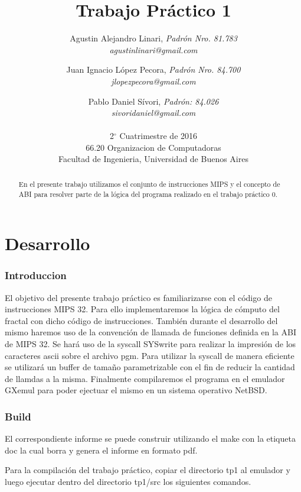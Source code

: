 \documentclass{article}
\title{Trabajo Práctico 1}
\author{
  Agustin Alejandro Linari, \textit{Padrón Nro. 81.783}\\
  \textit{agustinlinari@gmail.com}\\
  \and
  Juan Ignacio López Pecora, \textit{Padrón Nro. 84.700}\\
  \textit{jlopezpecora@gmail.com}\\
  \and
  Pablo Daniel Sívori, \textit{Padrón: 84.026}\\
  \textit{sivoridaniel@gmail.com}\\
  \\
  \normalsize{2$^{\circ}$ Cuatrimestre de 2016}                           \\
  \normalsize{66.20 Organizacion de Computadoras}                  \\
  \normalsize{Facultad de Ingenieria, Universidad de Buenos Aires} \\
}
\begin{document}

\maketitle


\begin{abstract}
En el presente trabajo utilizamos el conjunto de instrucciones MIPS y el concepto de ABI para resolver parte de la lógica del programa realizado en el trabajo práctico 0. 
\end{abstract}

\clearpage

\tableofcontents
\clearpage

\part{Desarrollo}

\section{Introduccion}

El objetivo del presente trabajo práctico es familiarizarse con el código de instrucciones MIPS 32. Para ello implementaremos la lógica de cómputo del fractal con dicho código de instrucciones. También durante el desarrollo del mismo haremos uso de la convención de llamada de funciones definida en la ABI de MIPS 32. Se hará uso de la syscall SYSwrite para realizar la impresión de los caracteres ascii sobre el archivo pgm. Para utilizar la syscall de manera eficiente se utilizará un buffer de tamaño parametrizable con el fin de reducir la cantidad de llamdas a la misma. Finalmente compilaremos el programa en el emulador GXemul para poder ejectuar el mismo en un sistema operativo NetBSD.

\section{Build}
El correspondiente informe se puede construir utilizando el make con la etiqueta doc la cual borra y genera el informe en formato pdf.

Para la compilación del trabajo práctico, copiar el directorio tp1 al emulador y luego ejecutar dentro del directorio tp1/src los siguientes comandos.
\end{document}
